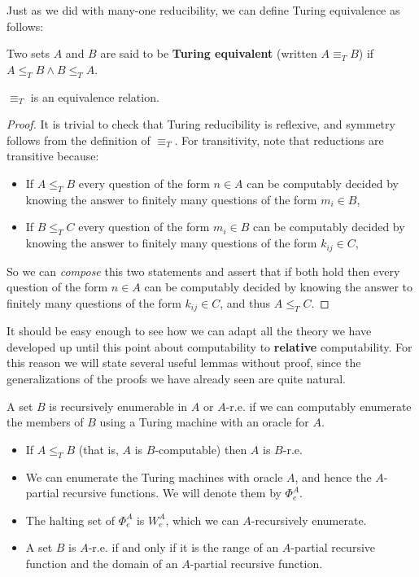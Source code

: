\documentclass[../main.tex]{memoir}
\begin{document}
Just as we did with many-one reducibility, we can define Turing equivalence as follows:

\begin{definition}
  Two sets $A$ and $B$ are said to be \textbf{Turing equivalent} (written $A \equiv_T B$) if $A \le_T B \land B \le_T A$.
\end{definition}

\begin{lemma}
  \label{lemma:turing-equivalence}
  $\equiv_T$ is an equivalence relation.
\end{lemma}
\begin{proof}
  It is trivial to check that Turing reducibility is reflexive, and symmetry follows from the definition of $\equiv_T$. For transitivity, note that reductions are transitive because:
  \begin{itemize}
  \item If $A \le_T B$ every question of the form $n \in A$ can be computably decided by knowing the answer to finitely many questions of the form $m_i \in B$,
  \item If $B \le_T C$ every question of the form $m_i \in B$ can be computably decided by knowing the answer to finitely many questions of the form $k_{ij} \in C$,
  \end{itemize}
  So we can \textit{compose} this two statements and assert that if both hold then every question of the form $n \in A$ can be computably decided by knowing the answer to finitely many questions of the form $k_{ij} \in C$, and thus $A \le_T C$.
\end{proof}

It should be easy enough to see how we can adapt all the theory we have developed up until this point about computability to \textbf{relative} computability. For this reason we will state several useful lemmas without proof, since the generalizations of the proofs we have already seen are quite natural.

\begin{definition}
  A set $B$ is recursively enumerable in $A$ or $A$-r.e. if we can computably enumerate the members of $B$ using a Turing machine with an oracle for $A$.
\end{definition}

\begin{lemma}
  \label{lemma:relative-computability-properties}
  \begin{itemize}
  \item If $A \le_T B$ (that is, $A$ is $B$-computable) then $A$ is $B$-r.e.
  \item We can enumerate the Turing machines with oracle $A$, and hence the $A$-partial recursive functions. We will denote them by $\Phi_e^A$.
  \item The halting set of $\Phi_e^A$ is $W_e^A$, which we can $A$-recursively enumerate.
  \item A set $B$ is $A$-r.e. if and only if it is the range of an $A$-partial recursive function and the domain of an $A$-partial recursive function.
  \end{itemize}
\end{lemma}
\end{document}

